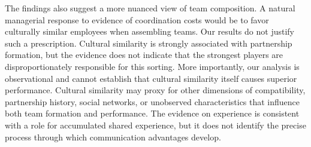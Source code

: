 \documentclass[10pt]{article}
\begin{document}

The findings also suggest a more nuanced view of team composition. A natural managerial response to evidence of coordination costs would be to favor culturally similar employees when assembling teams. Our results do not justify such a prescription. Cultural similarity is strongly associated with partnership formation, but the evidence does not indicate that the strongest players are disproportionately responsible for this sorting. More importantly, our analysis is observational and cannot establish that cultural similarity itself causes superior performance. Cultural similarity may proxy for other dimensions of compatibility, partnership history, social networks, or unobserved characteristics that influence both team formation and performance. The evidence on experience is consistent with a role for accumulated shared experience, but it does not identify the precise process through which communication advantages develop.

\end{document}
